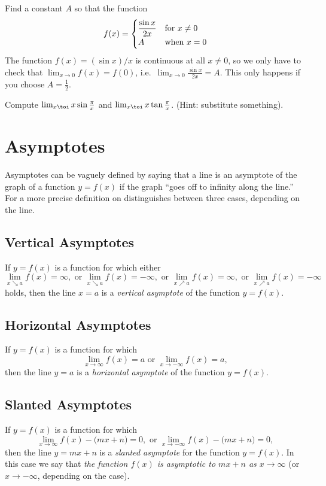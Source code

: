 \begin{multicols}{2}
\problem Find a constant \(A\) so that the function
\[
f(x) =
\begin{cases}
  \dfrac{\sin x}{2x} &\hbox{for $x\ne0$} \\
  A & \hbox{when \(x=0\)}
\end{cases}
\]
\answer
The function \(f(x) = (\sin x)/x\) is continuous at all \(x\ne 0\),
so we only have to check that \(\lim_{x\to0} f(x) = f(0)\), i.e.\
\(\lim_{x\to0}\frac{\sin x}{2x} = A\).  This only happens if you
choose \(A=\frac12\).
\endanswer

\problem Compute $\lim_{x\toi}x\sin\frac \pi x$ and $\lim_{x\toi}x
\tan\frac\pi x$. (Hint: substitute something).


\end{multicols}
\noproblemfont


\section{Asymptotes}
\label{sec:asymptotes}
Asymptotes can be vaguely defined by saying that a line is an asymptote of the
graph of a function $y=f(x)$ if the graph ``goes off to infinity along the
line.'' For a more precise definition on distinguishes between three cases,
depending on the line.

\subsection{Vertical Asymptotes}
If $y=f(x)$ is a function for which either
\[
\lim_{x\searrow a} f(x) = \infty,
\text{ or }
\lim_{x\searrow a} f(x) = -\infty,
\text{ or }
\lim_{x\nearrow a} f(x) = \infty,
\text{ or }
\lim_{x\nearrow a} f(x) = -\infty
\]
holds, then the line $x=a$ is a \emph{vertical asymptote} of the function $y=f(x)$.

\subsection{Horizontal Asymptotes}
If $y=f(x)$ is a function for which
\[
\lim_{x\to \infty} f(x) = a \text{ or }
\lim_{x\to-\infty} f(x) = a,
\]then the line $y=a$ is a \emph{horizontal asymptote} of the function
$y=f(x)$.

\subsection{Slanted Asymptotes}
\label{sec:03slanted-asymptotes}
If $y=f(x)$ is a function for which
\[
\lim_{x\to\infty} f(x) - \bigl(mx+n\bigr) =0,\text{ or }
\lim_{x\to-\infty} f(x) - \bigl(mx+n\bigr) =0,
\]
then the line $y=mx+n$ is a \emph{slanted asymptote} for the function
$y=f(x)$.
In this case we say that \emph{the function $f(x)$ is asymptotic to
$mx+n$ as $x\to\infty$} (or $x\to-\infty$, depending on the case).

